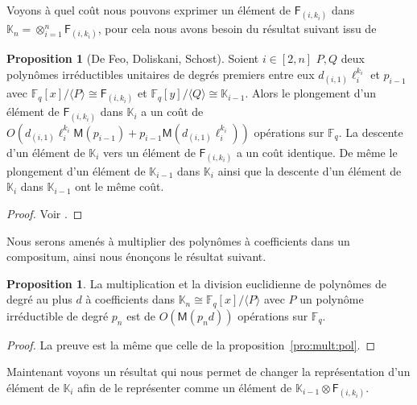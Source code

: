 \documentclass[10pt,a4paper]{book}
\theoremstyle{plain}
\theoremstyle{definition}
\theoremstyle{definition}
\theoremstyle{definition}
\theoremstyle{definition}
\newtheorem{prop}[thm]{Proposition}
\theoremstyle{definition}
\theoremstyle{remark}
\theoremstyle{remark}
\theoremstyle{definition}
\begin{document}
Voyons à quel coût nous pouvons exprimer un élément de $\mathsf{F}_{(i,k_i)}$ dans 
$\mathbb{K}_n=\otimes_{i=1}^n\mathsf{F}_{(i,k_i)}$, pour cela nous avons 
besoin du résultat suivant issu de \cite[Theorem 1]{DeFeoDoliskaniSchost14}
\begin{prop}[De Feo, Doliskani, Schost]
\label{pro:com:inj}
Soient $i \in [2,n] $ $P,Q$ deux polynômes irréductibles unitaires de degrés 
premiers entre eux $d_{(i,1)}\ell_i^{k_i}$ et $p_{i-1}$ avec
$\mathbb{F}_q[x]/\langle P \rangle \cong \mathsf{F}_{(i,k_i)}$ et 
$\mathbb{F}_q[y]/\langle Q \rangle \cong \mathbb{K}_{i-1}$. Alors le 
plongement d'un élément de $\mathsf{F}_{(i,k_i)} $  dans $\mathbb{K}_{i}$ a un
coût de 
$O(d_{(i,1)}\ell_i^{k_i}\mathsf{M}(p_{i-1})+p_{i-1}\mathsf{M}(d_{(i,1)}\ell_i^{k_i}))$ 
opérations sur $\mathbb{F}_q$. La descente d'un élément de $\mathbb{K}_{i} $
vers un élément de $\mathsf{F}_{(i,k_i)}$  a un coût identique. 
De même le plongement d'un élément de $\mathbb{K}_{i-1}$ dans 
$\mathbb{K}_{i}$ ainsi que la descente d'un élément de $\mathbb{K}_{i}$ dans 
$\mathbb{K}_{i-1}$ ont le même coût.
\end{prop}

\begin{proof}
Voir \cite{DeFeoDoliskaniSchost14}.
\end{proof}  

Nous serons amenés à multiplier des polynômes à coefficients dans un 
compositum, ainsi nous énonçons le résultat suivant.

\begin{prop}
\label{pro:mul:com}
La multiplication et la division euclidienne de polynômes de degré au plus $d$
à coefficients dans $\mathbb{K}_{n} \cong \mathbb{F}_q[x]/ \langle P \rangle$
avec $P$ un polynôme irréductible de degré $p_n$ est de $O(\mathsf{M}(p_nd))$ 
opérations sur $\mathbb{F}_q$.
\end{prop} 
 
\begin{proof}
La preuve est la même que celle de la proposition~\ref{pro:mult:pol}.
\end{proof}
 
 
Maintenant voyons un résultat qui nous permet de changer la 
représentation d'un élément de $\mathbb{K}_i$ afin de le représenter comme un 
élément de $\mathbb{K}_{i-1} \otimes \mathsf{F}_{(i,k_i)}$. 
\end{document}
